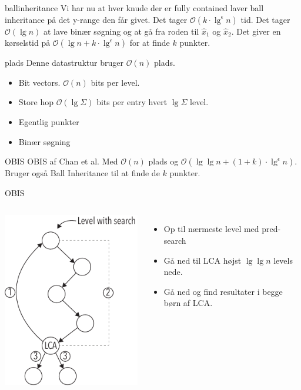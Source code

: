 \documentclass[pdf]{beamer}
\begin{document}
\begin{frame}{ballinheritance}
  Vi har nu at hver knude der er fully contained laver ball inheritance på det y-range den får givet. Det tager $\mathcal{O}(k\cdot\lg^\epsilon n)$ tid. Det tager $\mathcal{O}(\lg n)$ at lave binær søgning og at gå fra roden til $\hat{x}_1$ og $\hat{x}_2$.
  \pause
  Det giver en kørselstid på $\mathcal{O}(\lg n + k\cdot\lg^\epsilon n)$ for at finde $k$ punkter.
\end{frame}


\begin{frame}{plads}
  Denne datastruktur bruger $\mathcal{O}(n)$ plads.
  \begin{itemize}
    \item Bit vectors. $\mathcal{O}(n)$ bits per level.
      \pause
    \item Store hop $\mathcal{O}(\lg \Sigma)$ bits per entry hvert $\lg \Sigma$ level.
      \pause
    \item Egentlig punkter
      \pause
    \item Binær søgning
  \end{itemize}
\end{frame}

\begin{frame}{OBIS}
  OBIS af Chan et al. Med $\mathcal{O}(n)$ plads og $\mathcal{O}(\lg \lg n + (1+k)\cdot\lg^\epsilon n)$. Bruger også Ball Inheritance til at finde de $k$ punkter.
\end{frame}

\begin{frame}{OBIS}
  \begin{columns}
    \includegraphics{pictures/ors_step2-eps-converted-to.pdf}
    \begin{itemize}
      \item Op til nærmeste level med pred-search
      \item Gå ned til LCA højst $\lg \lg n$ levels nede.
      \item Gå ned og find resultater i begge børn af LCA.
    \end{itemize}

  \end{columns}
\end{frame}
\end{document}
